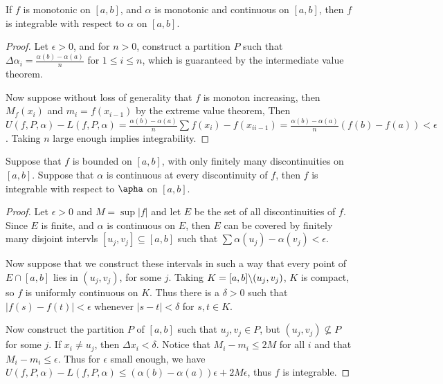 \begin{theorem}\label{7.1.8}
    If $f$ is monotonic on  $[a,b]$, and  $\alpha$ is monotonic and continuous
    on  $[a,b]$, then  $f$ is integrable with respect to  $\alpha$ on  $[a,b]$.
\end{theorem}
\begin{proof}
    Let $\epsilon>0$, and for  $n>0$, construct a partition  $P$ such that
    $\Delta{\alpha_i}=\frac{\alpha(b)-\alpha(a)}{n}$ for $1 \leq i \leq n$,
    which is guaranteed by the intermediate value theorem.

    Now suppose without loss of generality that $f$ is monoton increasing, then
    $M_f(x_i)$ and  $m_i=f(x_{i-1})$  by the extreme value theorem, Then
    $U(f,P,\alpha)-L(f,P,\alpha)=\frac{\alpha(b)-\alpha(a)}{n}\sum{f(x_i)-f(x_{ii-1})}=
    \frac{\alpha(b)-\alpha(a)}{n}(f(b)-f(a))<\epsilon$. Taking $n$ large enough
    implies integrability.
\end{proof}

\begin{theorem}\label{7.1.9}
    Suppose that $f$ is bounded on  $[a,b]$, with only finitely many
    discontinuities on  $[a,b]$. Suppose that  $\alpha$ is continuous at every
    discontinuity of  $f$, then  $f$ is integrable with respect to  $\apha$ on
    $[a,b]$.
\end{theorem}
\begin{proof}
    Let $\epsilon>0$ and  $M=\sup{|f|}$ and let  $E$ be the set of all
    discontinuities of  $f$. Since  $E$ is finite, and  $\alpha$ is continuous
    on  $E$, then  $E$ can be covered by finitely many disjoint intervls
    $[u_j,v_j] \subseteq [a,b]$ such that
    $\sum{\alpha(u_j)-\alpha(v_j)}<\epsilon$.

    Now suppose that we construct these intervals in such a way that every point
    of $E \cap [a,b]$ lies in $(u_j,v_j)$, for some  $j$. Taking
    $K=[a,b] \backslash (u_j,v_j)$,  $K$ is compact, so  $f$ is uniformly continuous
    on $K$. Thus there is a $\delta>0$ such that  $|f(s)-f(t)|<\epsilon$
    whenever  $|s-t|<\delta$ for  $s,t \in K$.

    Now construct the partition  $P$ of $[a,b]$ such that $u_j,v_j \in P$, but
    $(u_j,v_j) \not\subseteq P$ for some  $j$. If  $x_i \neq u_j$, then
    $\Delta{x_i}<\delta$. Notice that  $M_i-m_i \leq 2M$ for all  $i$ and that
    $M_i-m_i \leq \epsilon$. Thus for  $\epsilon$ small enough, we have
    $U(f,P,\alpha)-L(f,P,\alpha) \leq (\alpha(b)-\alpha(a))\epsilon+2M\epsilon$,
    thus $f$ is integrable.
\end{proof}

